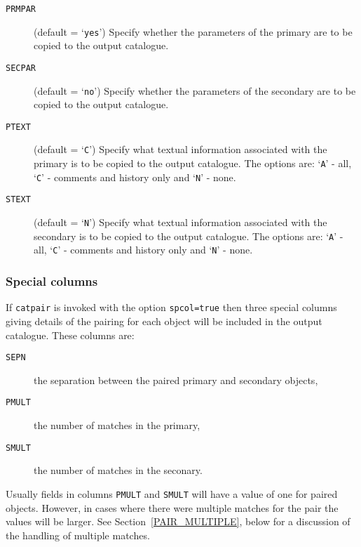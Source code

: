 \documentclass[twoside,11pt]{article}
\renewcommand{\_}{\texttt{\symbol{95}}}
\begin{document}
\begin{description}
  \item[ {\tt PRMPAR} ] (default = `{\tt yes}') Specify whether the
   parameters of the primary are to be copied to the output catalogue.

  \item[ {\tt SECPAR} ] (default = `{\tt no}') Specify whether the
   parameters of the secondary are to be copied to the output catalogue.

  \item[ {\tt PTEXT} ] (default = `{\tt C}') Specify what textual
   information associated with the primary is to be copied to the output
   catalogue.  The options are: `{\tt A}' - all,  `{\tt C}' - comments
   and history only and `{\tt N}' - none.

  \item[ {\tt STEXT} ] (default = `{\tt N}') Specify what textual
   information associated with the secondary is to be copied to the output
   catalogue.  The options are: `{\tt A}' - all,  `{\tt C}' - comments
   and history only and `{\tt N}' - none.

\end{description}

\subsubsection{\label{PAIR_SPCOL}Special columns}

If {\tt catpair} is invoked with the option {\tt spcol=true} then three
special columns giving details of the pairing for each object will be
included in the output catalogue.  These columns are:

\begin{description}

  \item[{\tt SEPN}] the separation between the paired primary and secondary
   objects,

  \item[{\tt PMULT}] the number of matches in the primary,

  \item[{\tt SMULT}] the number of matches in the seconary.

\end{description}

Usually fields in columns {\tt PMULT} and {\tt SMULT} will have a value
of one for paired objects.  However, in cases where there were multiple
matches for the pair the values will be larger.  See
Section~\ref{PAIR_MULTIPLE}, below for a discussion of the handling of
multiple matches.
\end{document}
